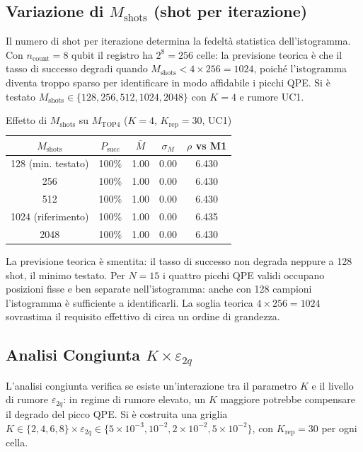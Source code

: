 \begin{onehalfspace}
\subsection{Variazione di $M_{\text{shots}}$ (shot per iterazione)}
\label{subsec:sweep_shots}

Il numero di shot per iterazione determina la fedeltà statistica dell'istogramma. Con $n_{\text{count}}=8$ qubit il registro ha $2^8=256$ celle: la previsione teorica è che il tasso di successo degradi quando $M_{\text{shots}} < 4 \times 256 = 1024$, poiché l'istogramma diventa troppo sparso per identificare in modo affidabile i picchi QPE. Si è testato $M_{\text{shots}} \in \{128, 256, 512, 1024, 2048\}$ con $K=4$ e rumore UC1.

\begin{table}[H]
\centering
\caption{Effetto di $M_{\text{shots}}$ su $M_{\text{TOP4}}$ ($K=4$, $K_{\text{rep}}=30$, UC1)}
\label{tab:sweep_shots}
\begin{tabular}{ccccc}
\hline
$M_{\text{shots}}$ & $P_{\text{succ}}$ & $\bar{M}$ & $\sigma_M$ & $\rho$ vs M1 \\
\hline
128  (min. testato) & 100\% & 1.00 & 0.00 & 6.430 \\
256               & 100\% & 1.00 & 0.00 & 6.430 \\
512               & 100\% & 1.00 & 0.00 & 6.430 \\
1024 (riferimento) & 100\% & 1.00 & 0.00 & 6.435 \\
2048              & 100\% & 1.00 & 0.00 & 6.430 \\
\hline
\end{tabular}
\end{table}

La previsione teorica è smentita: il tasso di successo non degrada neppure a 128 shot, il minimo testato. Per $N=15$ i quattro picchi QPE validi occupano posizioni fisse e ben separate nell'istogramma: anche con 128 campioni l'istogramma è sufficiente a identificarli. La soglia teorica $4 \times 256 = 1024$ sovrastima il requisito effettivo di circa un ordine di grandezza.

\subsection{Analisi Congiunta $K \times \varepsilon_{2q}$}
\label{subsec:sweep_joint}

L'analisi congiunta verifica se esiste un'interazione tra il parametro $K$ e il livello di rumore $\varepsilon_{2q}$: in regime di rumore elevato, un $K$ maggiore potrebbe compensare il degrado del picco QPE. Si è costruita una griglia $K \in \{2, 4, 6, 8\} \times \varepsilon_{2q} \in \{5\times10^{-3}, 10^{-2}, 2\times10^{-2}, 5\times10^{-2}\}$, con $K_{\text{rep}}=30$ per ogni cella.


\end{onehalfspace}
